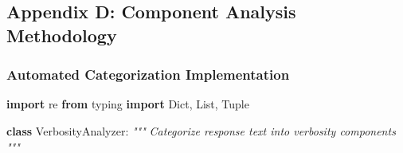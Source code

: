 \documentclass[
  11pt]{article}
\newenvironment{Shaded}{}{}
\newcommand{\CommentTok}[1]{\textcolor[rgb]{0.38,0.63,0.69}{\textit{#1}}}
\newcommand{\ImportTok}[1]{\textcolor[rgb]{0.00,0.50,0.00}{\textbf{#1}}}
\newcommand{\KeywordTok}[1]{\textcolor[rgb]{0.00,0.44,0.13}{\textbf{#1}}}
\newcommand{\NormalTok}[1]{#1}
\begin{document}
\subsection{Appendix D: Component Analysis
Methodology}\label{appendix-d-component-analysis-methodology}

\subsubsection{Automated Categorization
Implementation}\label{automated-categorization-implementation}

\begin{Shaded}
\begin{Highlighting}[]
\ImportTok{import}\NormalTok{ re}
\ImportTok{from}\NormalTok{ typing }\ImportTok{import}\NormalTok{ Dict, List, Tuple}

\KeywordTok{class}\NormalTok{ VerbosityAnalyzer:}
    \CommentTok{"""}
\CommentTok{    Categorize response text into verbosity components}
\CommentTok{    """}
    

\end{Highlighting}
\end{Shaded}
\end{document}
